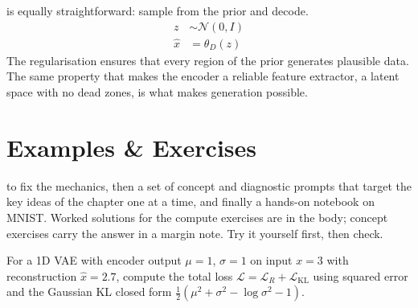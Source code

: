 
 is equally straightforward: sample from the prior and decode.
\begin{align*}
    z         &\sim \mathcal{N}(0, I) \\
    \hat{x}   &= \theta_D(z)
\end{align*}
The regularisation ensures that every region of the prior generates plausible data.
The same property that makes the encoder a reliable feature extractor, a latent space with no dead zones, is what makes generation possible.













\newpage

\section{Examples \& Exercises}

 to fix the mechanics, then a set of concept and diagnostic prompts that target the key ideas of the chapter one at a time, and finally a hands-on notebook on MNIST.
Worked solutions for the compute exercises are in the body; concept exercises carry the answer in a margin note. Try it yourself first, then check.


For a 1D VAE with encoder output $\mu{=}1$, $\sigma{=}1$ on input $x{=}3$ with reconstruction $\hat{x}{=}2.7$, compute the total loss $\mathcal{L} = \mathcal{L}_R + \mathcal{L}_{\text{KL}}$ using squared error and the Gaussian KL closed form $\tfrac{1}{2}(\mu^2 + \sigma^2 - \log \sigma^2 - 1)$.

